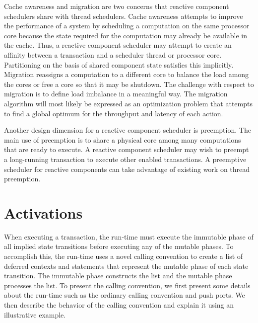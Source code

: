 Cache awareness and migration are two concerns that reactive component schedulers share with thread schedulers.
Cache awareness attempts to improve the performance of a system by scheduling a computation on the same processor core because the state required for the computation may already be available in the cache.
Thus, a reactive component scheduler may attempt to create an affinity between a transaction and a scheduler thread or processor core.
Partitioning on the basis of shared component state satisfies this implicitly.
Migration reassigns a computation to a different core to balance the load among the cores or free a core so that it may be shutdown.
The challenge with respect to migration is to define load imbalance in a meaningful way.
The migration algorithm will most likely be expressed as an optimization problem that attempts to find a global optimum for the throughput and latency of each action.

Another design dimension for a reactive component scheduler is preemption.
The main use of preemption is to share a physical core among many computations that are ready to execute.
A reactive component scheduler may wish to preempt a long-running transaction to execute other enabled transactions.
A preemptive scheduler for reactive components can take advantage of existing work on thread preemption.

\section{Activations}

When executing a transaction, the run-time must execute the immutable phase of all implied state transitions before executing any of the mutable phases.
To accomplish this, the run-time uses a novel calling convention to create a list of deferred contexts and statements that represent the mutable phase of each state transition.
The immutable phase constructs the list and the mutable phase processes the list.
To present the calling convention, we first present some details about the run-time such as the ordinary calling convention and push ports.
We then describe the behavior of the calling convention and explain it using an illustrative example.

